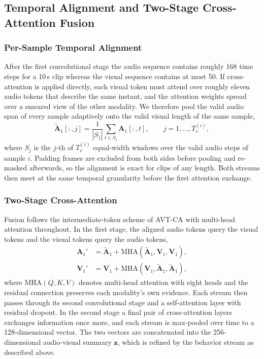 \documentclass[journal]{IEEEtran}
\begin{document}
\subsection{Temporal Alignment and Two-Stage Cross-Attention Fusion}

\subsubsection{Per-Sample Temporal Alignment}
After the first convolutional stage the audio sequence contains roughly 168 time steps for a 10\,s clip whereas the visual sequence contains at most 50. If cross-attention is applied directly, each visual token must attend over roughly eleven audio tokens that describe the same instant, and the attention weights spread over a smeared view of the other modality. We therefore pool the valid audio span of every sample adaptively onto the valid visual length of the same sample,
\begin{equation}
\tilde{\mathbf{A}}_1[:, j] = \frac{1}{|S_j|}\sum_{t \in S_j} \mathbf{A}_1[:, t], \qquad j = 1,\dots,T_v^{(i)},
\end{equation}
where $S_j$ is the $j$-th of $T_v^{(i)}$ equal-width windows over the valid audio steps of sample $i$. Padding frames are excluded from both sides before pooling and re-masked afterwards, so the alignment is exact for clips of any length. Both streams then meet at the same temporal granularity before the first attention exchange.

\subsubsection{Two-Stage Cross-Attention}
Fusion follows the intermediate-token scheme of AVT-CA \cite{venkatraman2025avtca} with multi-head attention throughout. In the first stage, the aligned audio tokens query the visual tokens and the visual tokens query the audio tokens,
\begin{align}
\mathbf{A}_1' &= \tilde{\mathbf{A}}_1 + \mathrm{MHA}(\tilde{\mathbf{A}}_1, \mathbf{V}_1, \mathbf{V}_1), \\
\mathbf{V}_1' &= \mathbf{V}_1 + \mathrm{MHA}(\mathbf{V}_1, \tilde{\mathbf{A}}_1, \tilde{\mathbf{A}}_1),
\end{align}
where $\mathrm{MHA}(Q,K,V)$ denotes multi-head attention with eight heads and the residual connection preserves each modality's own evidence. Each stream then passes through its second convolutional stage and a self-attention layer with residual dropout. In the second stage a final pair of cross-attention layers exchanges information once more, and each stream is max-pooled over time to a 128-dimensional vector. The two vectors are concatenated into the 256-dimensional audio-visual summary $\mathbf{z}$, which is refined by the behavior stream as described above.
\end{document}
